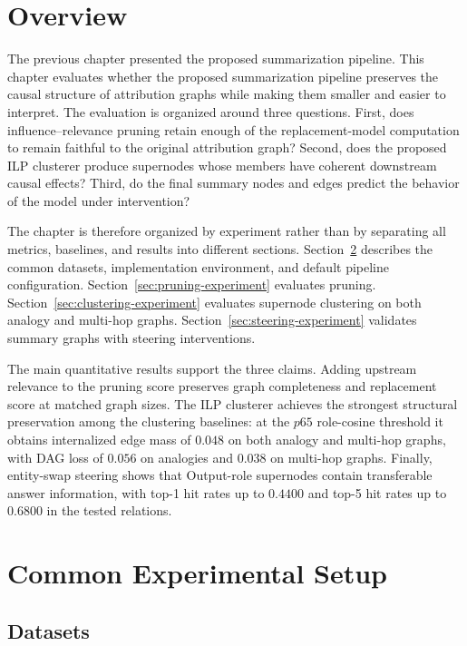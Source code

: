 \documentclass[../main.tex]{subfiles}
\begin{document}
\section{Overview}

The previous chapter presented the proposed summarization pipeline. This chapter evaluates whether the proposed summarization pipeline preserves the
causal structure of attribution graphs while making them smaller and easier to
interpret. The evaluation is organized around three questions. First, does
influence--relevance pruning retain enough of the replacement-model computation
to remain faithful to the original attribution graph? Second, does the proposed
ILP clusterer produce supernodes whose members have coherent downstream causal
effects? Third, do the final summary nodes and edges predict the behavior of the
model under intervention?

The chapter is therefore organized by experiment rather than by separating all
metrics, baselines, and results into different sections. Section~\ref{sec:setup}
describes the common datasets, implementation environment, and default pipeline
configuration. Section~\ref{sec:pruning-experiment} evaluates pruning.
Section~\ref{sec:clustering-experiment} evaluates supernode clustering on both
analogy and multi-hop graphs. Section~\ref{sec:steering-experiment} validates
summary graphs with steering interventions.

The main quantitative results support the three claims. Adding upstream
relevance to the pruning score preserves graph completeness and replacement
score at matched graph sizes. The ILP clusterer achieves the strongest
structural preservation among the clustering baselines: at the $p65$ role-cosine
threshold it obtains internalized edge mass of $0.048$ on both analogy and
multi-hop graphs, with DAG loss of $0.056$ on analogies and $0.038$ on multi-hop
graphs. Finally, entity-swap steering shows that Output-role supernodes contain
transferable answer information, with top-1 hit rates up to $0.4400$ and top-5
hit rates up to $0.6800$ in the tested relations.

\section{Common Experimental Setup}
\label{sec:setup}
\label{sec:datasets}

\subsection{Datasets}
\end{document}
